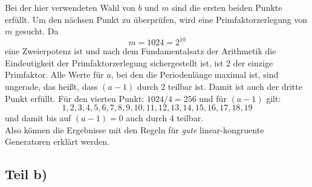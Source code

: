 Bei der hier verwendeten Wahl von $b$ und $m$ sind die ersten beiden Punkte erfüllt.
Um den nächsen Punkt zu überprüfen, wird eine Primfaktorzerlegung von $m$ gesucht.
Da
\begin{equation*}
  m=1024=2^{10}
\end{equation*}
eine Zweierpotenz ist und nach dem Fundamentalsatz der Arithmetik die Eindeutigkeit
der Primfaktorzerlegung sichergestellt ist, ist 2 der einzige Primfaktor.
Alle Werte für $a$, bei den die Periodenlänge maximal ist, sind ungerade, das heißt,
dass $(a-1)$ durch 2 teilbar ist. Damit ist auch der dritte Punkt erfüllt.
Für den vierten Punkt: $1024/4=256$ und für $(a-1)$ gilt:
\begin{equation*}
  1,2,3,4,5,6,7,8,9,10,11,12,13,14,15,16,17,18,19
\end{equation*}
und damit bis auf $(a-1)=0$ auch durch 4 teilbar.\\
Also können die Ergebnisse mit den Regeln für \textit{gute} linear-kongruente
Generatoren erklärt werden.
\subsection{Teil b)}
